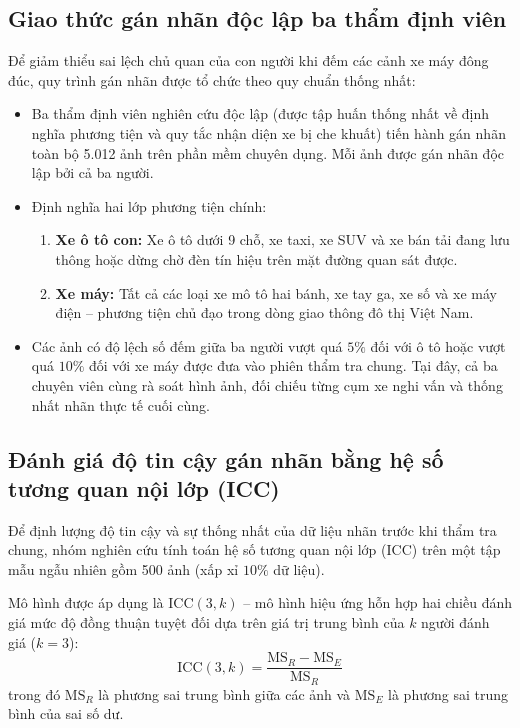\subsection{Giao thức gán nhãn độc lập ba thẩm định viên}
Để giảm thiểu sai lệch chủ quan của con người khi đếm các cảnh xe máy đông đúc, quy trình gán nhãn được tổ chức theo quy chuẩn thống nhất:
\begin{itemize}
    \item Ba thẩm định viên nghiên cứu độc lập (được tập huấn thống nhất về định nghĩa phương tiện và quy tắc nhận diện xe bị che khuất) tiến hành gán nhãn toàn bộ 5.012 ảnh trên phần mềm chuyên dụng. Mỗi ảnh được gán nhãn độc lập bởi cả ba người.
    \item Định nghĩa hai lớp phương tiện chính:
    \begin{enumerate}
        \item \textbf{Xe ô tô con:} Xe ô tô dưới 9 chỗ, xe taxi, xe SUV và xe bán tải đang lưu thông hoặc dừng chờ đèn tín hiệu trên mặt đường quan sát được.
        \item \textbf{Xe máy:} Tất cả các loại xe mô tô hai bánh, xe tay ga, xe số và xe máy điện -- phương tiện chủ đạo trong dòng giao thông đô thị Việt Nam.
    \end{enumerate}
    \item Các ảnh có độ lệch số đếm giữa ba người vượt quá $5\%$ đối với ô tô hoặc vượt quá $10\%$ đối với xe máy được đưa vào phiên thẩm tra chung. Tại đây, cả ba chuyên viên cùng rà soát hình ảnh, đối chiếu từng cụm xe nghi vấn và thống nhất nhãn thực tế cuối cùng.
\end{itemize}

\subsection{Đánh giá độ tin cậy gán nhãn bằng hệ số tương quan nội lớp (ICC)}
Để định lượng độ tin cậy và sự thống nhất của dữ liệu nhãn trước khi thẩm tra chung, nhóm nghiên cứu tính toán hệ số tương quan nội lớp (ICC) trên một tập mẫu ngẫu nhiên gồm 500 ảnh (xấp xỉ $10\%$ dữ liệu). 

Mô hình được áp dụng là $\text{ICC}(3, k)$ -- mô hình hiệu ứng hỗn hợp hai chiều đánh giá mức độ đồng thuận tuyệt đối dựa trên giá trị trung bình của $k$ người đánh giá ($k=3$):
\begin{equation}
    \text{ICC}(3, k) = \frac{\text{MS}_R - \text{MS}_E}{\text{MS}_R}
\end{equation}
trong đó $\text{MS}_R$ là phương sai trung bình giữa các ảnh và $\text{MS}_E$ là phương sai trung bình của sai số dư.

